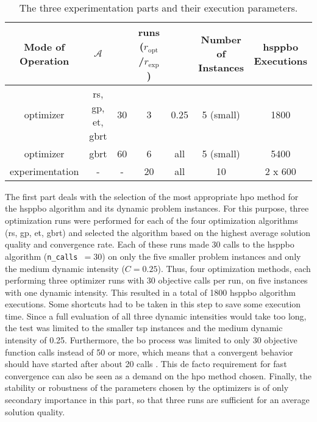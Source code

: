 \begin{table}[ht]
	 \caption{The three experimentation parts and their execution parameters.}
	\label{tab:exp-setup}
	\centering
	\begin{adjustbox}{width=1\textwidth}
	\begin{tabular}{c c c c c c c}
		\hline
		\thead{Mode of\\Operation} & \thead{HPO Method} $\mathcal{A}$ & \thead{n\_calls} & \thead{runs\\ ($r_\text{opt}$/$r_\text{exp}$)} & \thead{Dynamic Intensity $C$} & \thead{Number of\\Instances} & \thead{\gls{hsppbo}\\Executions} \\
		\hline
		optimizer & \makecell{\gls{rs}, \gls{gp},\\ \gls{et}, \gls{gbrt}} & 30 & 3 & 0.25 & 5 (small) & 1800 \\

		optimizer & \gls{gbrt} & 60 & 6 & all & 5 (small) & 5400 \\
		experimentation & - & - & 20 & all & 10  & 2 x 600 \\ \hline
	\end{tabular}
\end{adjustbox}
\end{table}

The first part deals with the selection of the most appropriate \gls{hpo} method for the \gls{hsppbo} algorithm and its dynamic problem instances. For this purpose, three optimization runs were performed for each of the four optimization algorithms (\gls{rs}, \gls{gp}, \gls{et}, \gls{gbrt}) and selected the algorithm based on the highest average solution quality and convergence rate. Each of these runs made 30 calls to the \gls{hsppbo} algorithm (\texttt{n\_calls }$= 30$) on only the five smaller problem instances and only the medium dynamic intensity ($C = 0.25$). Thus, four optimization methods, each performing three optimizer runs with 30 objective calls per run, on five instances with one dynamic intensity. This resulted in a total of 1800 \gls{hsppbo} algorithm executions. Some shortcuts had to be taken in this step to save some execution time. Since a full evaluation of all three dynamic intensities would take too long, the test was limited to the smaller \gls{tsp} instances and the medium dynamic intensity of 0.25. Furthermore, the \gls{bo} process was limited to only 30 objective function calls instead of 50 or more, which means that a convergent behavior should have started after about 20 calls \cite{head2016}. This de facto requirement for fast convergence can also be seen as a demand on the \gls{hpo} method chosen. Finally, the stability or robustness of the parameters chosen by the optimizers is of only secondary importance in this part, so that three runs are sufficient for an average solution quality.


